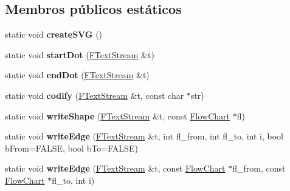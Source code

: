 \subsection*{Membros públicos estáticos}
\begin{DoxyCompactItemize}
\item 
\hypertarget{class_flow_chart_a352e5c221ab62d0ac5ad560028f80ccb}{static void {\bfseries create\-S\-V\-G} ()}\label{class_flow_chart_a352e5c221ab62d0ac5ad560028f80ccb}

\item 
\hypertarget{class_flow_chart_a9b769b1304d209cc77cf29814acfa854}{static void {\bfseries start\-Dot} (\hyperlink{class_f_text_stream}{F\-Text\-Stream} \&t)}\label{class_flow_chart_a9b769b1304d209cc77cf29814acfa854}

\item 
\hypertarget{class_flow_chart_a7475f497672a2e94b069484347b637e7}{static void {\bfseries end\-Dot} (\hyperlink{class_f_text_stream}{F\-Text\-Stream} \&t)}\label{class_flow_chart_a7475f497672a2e94b069484347b637e7}

\item 
\hypertarget{class_flow_chart_ae444d08ff2ef621e17a085ac3d5b4d49}{static void {\bfseries codify} (\hyperlink{class_f_text_stream}{F\-Text\-Stream} \&t, const char $\ast$str)}\label{class_flow_chart_ae444d08ff2ef621e17a085ac3d5b4d49}

\item 
\hypertarget{class_flow_chart_a3dbf9249c71dbe01b88ab296b899ca95}{static void {\bfseries write\-Shape} (\hyperlink{class_f_text_stream}{F\-Text\-Stream} \&t, const \hyperlink{class_flow_chart}{Flow\-Chart} $\ast$fl)}\label{class_flow_chart_a3dbf9249c71dbe01b88ab296b899ca95}

\item 
\hypertarget{class_flow_chart_ada21a02bec3838187e8c34c9ecaa1732}{static void {\bfseries write\-Edge} (\hyperlink{class_f_text_stream}{F\-Text\-Stream} \&t, int fl\-\_\-from, int fl\-\_\-to, int i, bool b\-From=F\-A\-L\-S\-E, bool b\-To=F\-A\-L\-S\-E)}\label{class_flow_chart_ada21a02bec3838187e8c34c9ecaa1732}

\item 
\hypertarget{class_flow_chart_a9c26f59b62514e144fc20baf83551b86}{static void {\bfseries write\-Edge} (\hyperlink{class_f_text_stream}{F\-Text\-Stream} \&t, const \hyperlink{class_flow_chart}{Flow\-Chart} $\ast$fl\-\_\-from, const \hyperlink{class_flow_chart}{Flow\-Chart} $\ast$fl\-\_\-to, int i)}\label{class_flow_chart_a9c26f59b62514e144fc20baf83551b86}


\end{DoxyCompactItemize}
